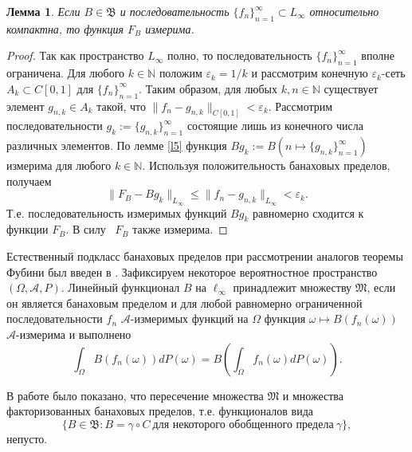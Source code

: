 \documentclass[12pt]{article}
\newtheorem{thm}{Теорема}
\newtheorem{lem}[thm]{Лемма}
\def\N{{\mathbb{N}}}
\def\B{{\mathfrak{B}}}
\begin{document}
\begin{lem}\label{l6}
Если $B\in \B$ и последовательность $\{f_n\}_{n=1}^\infty \subset L_\infty$  относительно компактна, то функция $F_B$ измерима.
\end{lem}

\begin{proof}
Так как пространство $L_\infty$ полно, то последовательность $\{f_n\}_{n=1}^\infty$ вполне ограничена. Для любого $k\in\N$ положим $\varepsilon_k=1/k$ и рассмотрим конечную $\varepsilon_k$-сеть $A_k\subset C[0,1]$ для $\{f_n\}_{n=1}^\infty$. Таким образом, для любых $k, n\in\N$ существует элемент $g_{n,k}\in A_k$ такой, что $\|f_n-g_{n,k}\|_{C[0,1]}<\varepsilon_k.$ Рассмотрим последовательности $g_k:=\{g_{n,k}\}_{n=1}^\infty$ состоящие лишь из конечного числа различных  элементов. По лемме \ref{l5} функция $Bg_k:= B(n\mapsto \{g_{n,k}\}_{n=1}^\infty)$ измерима для любого $k\in \N.$ Используя положительность банаховых пределов, получаем
$$\|F_B-Bg_{k}\|_{L_\infty}\le\|f_n-g_{n,k}\|_{L_\infty}<\varepsilon_k.$$
Т.е. последовательность измеримых функций $Bg_k$ равномерно сходится к функции $F_B$. В силу~\cite[Теорема 4.2.2]{NatansonTF} $F_B$ также измерима.
\end{proof}

Естественный подкласс банаховых пределов при рассмотрении аналогов теоремы Фубини был введен в \cite{Mokobodzki}.
Зафиксируем некоторое вероятностное пространство $(\Omega, \mathcal A, P)$. Линейный функционал $B$ на $\ell_\infty$ принадлежит множеству $\mathfrak M$, если он является банаховым пределом и для любой равномерно ограниченной последовательности $f_n$  $\mathcal A$-измеримых функций на $\Omega$ функция $\omega \mapsto B(f_n(\omega))$ $\mathcal A$-измерима и выполнено
\begin{equation}\label{Fubini1}
\int_\Omega B(f_n(\omega)) dP(\omega) = B\left(\int_\Omega f_n(\omega) dP(\omega)\right).
 \end{equation}

 В работе \cite{Bjorklund} было показано, что пересечение множества $\mathfrak M$ и множества факторизованных банаховых пределов, т.е. функционалов вида
$$\{ B\in \B : B=\gamma \circ C \ \text{для некоторого обобщенного предела} \ \gamma\},$$
непусто.

%


\printbibliography
\end{document}
